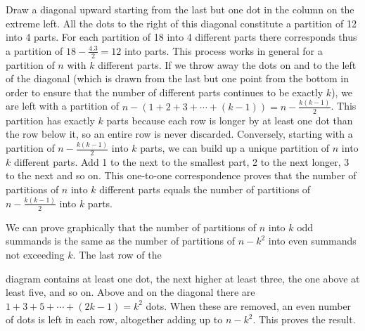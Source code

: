 Draw a diagonal upward starting from the last but one dot in the
column on the extreme left. All the dots to the right of this diagonal
constitute a partition of 12 into 4 parts. For each partition of 18
into 4 different parts there corresponds thus a partition of $18-
\frac{4.3}{2} =12$ into parts. This process works in general for a\pageoriginale 
partition of $n$ with $k$ different parts. If we throw away the dots
on and to the left of the diagonal (which is drawn from the last but
one point from the bottom in order to ensure that the number of
different parts continues to be exactly $k$), we are left with a
partition of $n-(1+2+3+\cdots+ (k-1))=n- \frac{k(k-1)}{2}$. This
partition has exactly $k$ parts because each row is longer by at least
one dot than the row below it, so an entire row is never
discarded. Conversely, starting with a partition of
$n-\frac{k(k-1)}{2}$ into $k$ parts, we can build up a unique
partition of $n$ into $k$ different parts. Add 1 to the next to the
smallest part, 2 to the next longer, 3 to the next and so on. This
one-to-one correspondence proves that the number of partitions of $n$
into $k$ different parts equals the number of partitions of
$n-\frac{k(k-1)}{2}$ into $k$ parts.

We can prove graphically that the number of partitions of $n$ into $k$
odd summands is the same as the number of partitions of $n-k^2$ into
even summands not exceeding $k$. The last row of the 

\begin{figure}[H]
\end{figure}
diagram contains at least one dot, the next higher at least three, the
one above at least five, and so on. Above and on the diagonal there
are $1+3+5+\cdots + (2k-1) =k^2$ dots. When these are removed, an even
number of dots is left in each row, altogether adding up to
$n-k^2$. This proves the result.

